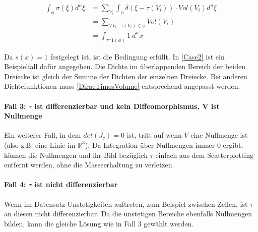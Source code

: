 \documentclass[a4paper,fontsize=12pt,toc=bib,halfparskip,ngerman]{scrartcl}
\begin{document}
\begin{equation}
\begin{split}
\int_{\phi}\sigma(\xi)d^n\xi &= \sum_{V_i}\int_{\phi}\delta(\xi - \tau(V_i)) \cdot Vol(V_i)d^n\xi\\
&= \sum_{\forall V_i~:~\tau(V_i)\in \phi} Vol(V_i)\\
&= \int_{\tau^-1(\phi)}1~d^nx
\end{split}
\end{equation}

Da $s(x) = 1$ festgelegt ist, ist die Bedingung erf\"ullt. In \cref{Case2} ist ein Beispielfall daf\"ur angegeben. Die Dichte im \"uberlappenden Bereich der beiden Dreiecke ist gleich der Summe der Dichten der einzelnen Dreiecke. Bei anderen Dichtefunktionen muss \cref{DiracTimesVolume} entsprechend angepasst werden.

\paragraph{Fall 3: $\tau$ ist differenzierbar und kein Diffeomorphismus, V ist Nullmenge}
Ein weiterer Fall, in dem $det(J_\tau) = 0$ ist, tritt auf wenn $V$ eine Nullmenge ist (also z.B. eine Linie im $\mathbb{R}^3$). Da Integration \"uber Nullmengen immer 0 ergibt, k\"onnen die Nullmengen und ihr Bild bez\"uglich $\tau$ einfach aus dem Scatterplotting entfernt werden, ohne die Masseerhaltung zu verletzen.

\paragraph{Fall 4: $\tau$ ist nicht differenzierbar}
Wenn im Datensatz Unstetigkeiten auftreten, zum Beispiel zwischen Zellen, ist $\tau$ an diesen nicht differenzierbar. Da die unstetigen Bereiche ebenfalls Nullmengen bilden, kann die gleiche L\"osung wie in Fall 3 gew\"ahlt werden.
\end{document}
